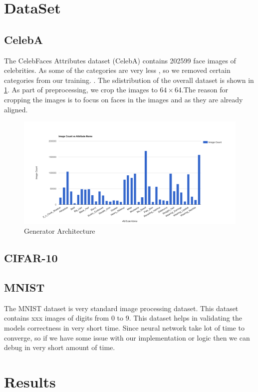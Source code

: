 \section{DataSet}
\subsection{CelebA}
The CelebFaces Attributes dataset (CelebA)\cite{celeba} contains 202599 face images of celebrities. As some of the categories are very less , so we removed certain categories from our training. . The sdistribution of the overall dataset is shown in \cref{fig:celeba}. As part of preprocessing, we crop the images to $64 \times 64$.The reason for cropping the images is to focus on faces in the images and as they are already aligned.


\begin{figure}[H]
  \centering
    \includegraphics[scale=.3, angle=0]{Files/celeba-visualize.png}
    \caption[Generator Architecture]{Generator Architecture\cite{DCGAN}}
    \label{fig:celeba}
\end{figure}
\subsection{CIFAR-10}

\subsection{MNIST}
The MNIST dataset is very standard image processing dataset. This dataset contains xxx images of digits from 0 to 9. This dataset helps in validating the models correctness in very short time. Since neural  network take lot of time to converge, so if we have some issue with our implementation or logic then we can debug in very short amount of time.

\section{Results}

